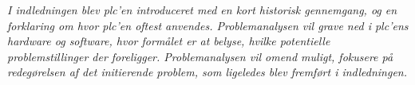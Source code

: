 \textit{I indledningen blev \gls{plc}'en introduceret med en kort historisk gennemgang, og en forklaring om hvor \gls{plc}'en oftest anvendes. Problemanalysen vil grave ned i \gls{plc}'ens hardware og software, hvor formålet er at belyse, hvilke potentielle problemstillinger der foreligger. Problemanalysen vil omend muligt, fokusere på redegørelsen af det initierende problem, som ligeledes blev fremført i indledningen.}


